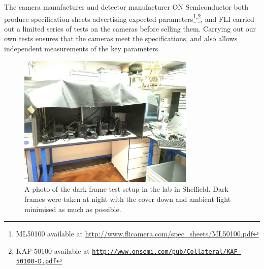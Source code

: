 \begin{colsection}
\begin{colsection}
The camera manufacturer  and detector manufacturer ON Semiconductor both produce specification sheets advertising expected parameters\footnote{ML50100 available at \url{http://www.flicamera.com/spec_sheets/ML50100.pdf}}\textsuperscript{,}\footnote{KAF-50100 available at \href{http://www.onsemi.com/pub/Collateral/KAF-50100-D.PDF}{\texttt{http://www.onsemi.com/pub/Collateral/KAF-50100-D.pdf}}}, and FLI carried out a limited series of tests on the cameras before selling them. Carrying out our own tests ensures that the cameras meet the specifications, and also allows independent measurements of the key parameters.

\begin{figure}[p]
    \begin{center}
        \includegraphics[width=0.75\textwidth]{images/dark_photo.jpg}
    \end{center}
    \caption[The dark frame test setup]{
        A photo of the dark frame test setup in the lab in Sheffield. Dark frames were taken at night with the cover down and ambient light minimised as much as possible.
    }\label{fig:dark_photo}
\end{figure}


\end{colsection}
\end{colsection}

